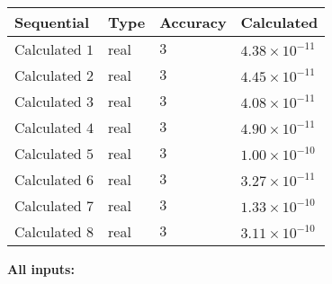 \documentclass[12pt]{article}
\begin{document}
   
   
   
\noindent{}
   
   
  
  
\noindent\begin{tabular}{|l|l|l|l|}
\hline
 Sequential & Type & Accuracy & Calculated \\ 
\hline
 
 
  Calculated $           1$ & real & $           3 $ & 
 $ 4.38 \times 10^{-11} $ 
 \\  \hline  
 
 
  Calculated $           2$ & real & $           3 $ & 
 $ 4.45 \times 10^{-11} $ 
 \\  \hline  
 
 
  Calculated $           3$ & real & $           3 $ & 
 $ 4.08 \times 10^{-11} $ 
 \\  \hline  
 
 
  Calculated $           4$ & real & $           3 $ & 
 $ 4.90 \times 10^{-11} $ 
 \\  \hline  
 
 
  Calculated $           5$ & real & $           3 $ & 
 $ 1.00 \times 10^{-10} $ 
 \\  \hline  
 
 
  Calculated $           6$ & real & $           3 $ & 
 $ 3.27 \times 10^{-11} $ 
 \\  \hline  
 
 
  Calculated $           7$ & real & $           3 $ & 
 $ 1.33 \times 10^{-10} $ 
 \\  \hline  
 
 
  Calculated $           8$ & real & $           3 $ & 
 $ 3.11 \times 10^{-10} $ 
 \\  \hline  
 \end{tabular}
   
   
   
   
\noindent\vspace{0.1in}\hspace{-0.08in} {\textbf{\Large{All inputs: }}}
   
   
  
\end{document}
